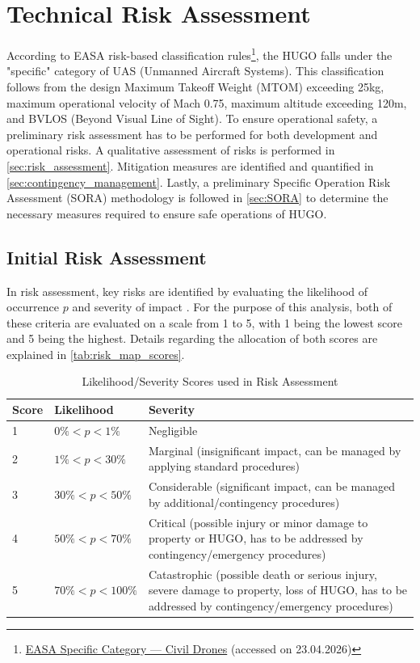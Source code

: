 \chapter{Technical Risk Assessment}
According to EASA risk-based classification rules\footnote{\href{https://www.easa.europa.eu/en/domains/drones-air-mobility/operating-drone/specific-category-civil-drones}{EASA Specific Category — Civil Drones} (accessed on 23.04.2026)}, the HUGO falls under the "specific" category of UAS (Unmanned Aircraft Systems). This classification follows from the design Maximum Takeoff Weight (MTOM) exceeding 25kg, maximum operational velocity of Mach 0.75, maximum altitude exceeding 120m, and BVLOS (Beyond Visual Line of Sight). To ensure operational safety, a preliminary risk assessment has to be performed for both development and operational risks. A qualitative assessment of risks is performed in \autoref{sec:risk_assessment}. Mitigation measures are identified and quantified in \autoref{sec:contingency_management}. Lastly, a preliminary Specific Operation Risk Assessment (SORA) methodology is followed in \autoref{sec:SORA} to determine the necessary measures required to ensure safe operations of HUGO.

\section{Initial Risk Assessment}
\label{sec:risk_assessment}

In risk assessment, key risks are identified by evaluating the likelihood of occurrence $p$ and severity of impact \cite{Lanzafame2024}. For the purpose of this analysis, both of these criteria are evaluated on a scale from 1 to 5, with 1 being the lowest score and 5 being the highest. Details regarding the allocation of both scores are explained in \autoref{tab:risk_map_scores}. 

\begin{table}[H]
    \centering
        \caption{Likelihood/Severity Scores used in Risk Assessment \cite{MITRECorporation2012}}
    \begin{tabular}{|p{1cm}|p{3.5cm}|p{10.5cm}|}
    \hline
        \textbf{Score} & \textbf{Likelihood} & \textbf{Severity} \\ \hline\hline
         1 & $0\%< p<1\%$ & Negligible \\   \hline
         2 & $1\%<p<30\%$ & Marginal (insignificant impact, can be managed by applying standard procedures) \\   \hline
         3 & $30\%<p<50\%$& Considerable (significant impact, can be managed by additional/contingency procedures) \\   \hline
         4 & $50\%<p<70\%$& Critical (possible injury or minor damage to property or HUGO, has to be addressed by contingency/emergency procedures) \\   \hline
         5 & $70\%<p<100\%$& Catastrophic (possible death or serious injury, severe damage to property, loss of HUGO, has to be addressed by contingency/emergency procedures) \\   \hline
    \end{tabular}
    \label{tab:risk_map_scores}
\end{table}

